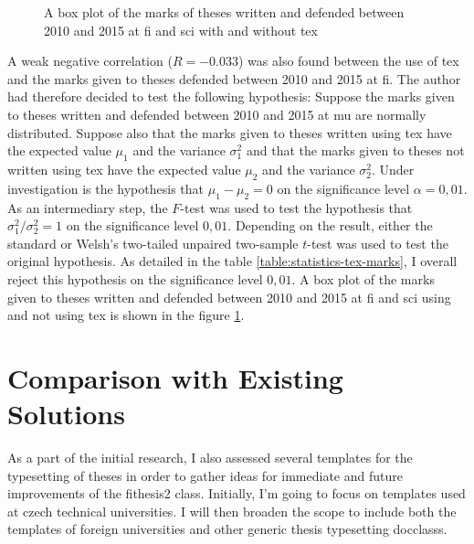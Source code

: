 \begin{figure}
    \caption{A box plot of the marks of theses written and defended between 2010 and 2015 at \gls{fi} and \gls{sci} with and without \gls{tex}}
    \label{fig:statistics-marks}
  \end{figure}

  A weak negative correlation ($R=-0.033$) was also found between the use of \gls{tex} and the marks given to theses defended between 2010 and 2015 at \gls{fi}. The author had therefore decided to test the following \gls{hypothesis}: Suppose the marks given to theses written and defended between 2010 and 2015 at \gls{mu} are normally distributed. Suppose also that the marks given to theses written using \gls{tex} have the expected value $\mu_1$ and the variance $\sigma_1^2$ and that the marks given to theses not written using \gls{tex} have the expected value $\mu_2$ and the variance $\sigma_2^2$. Under investigation is the \gls{hypothesis} that $\mu_1-\mu_2=0$ on the significance level $\alpha=0{,}01$. As an intermediary step, the $F$-test was used to test the \gls{hypothesis} that $\sigma_1^2/\sigma_2^2=1$ on the significance level $0{,}01$. Depending on the result, either the standard or Welsh's two-tailed unpaired two-sample $t$-test was used to test the original \gls{hypothesis}. As detailed in the table \ref{table:statistics-tex-marks}, I overall reject this \gls{hypothesis} on the significance level $0{,}01$. A box plot of the marks given to theses written and defended between 2010 and 2015 at \gls{fi} and \gls{sci} using and not using \gls{tex} is shown in the figure \ref{fig:statistics-marks}.

  \section{Comparison with Existing Solutions}
  As a part of the initial research, I also assessed several templates for the typesetting of theses in order to gather ideas for immediate and future improvements of the fithesis2 class. Initially, I'm going to focus on templates used at czech technical universities. I will then broaden the scope to include both the templates of foreign universities and other generic thesis typesetting \glspl{docclass}.

